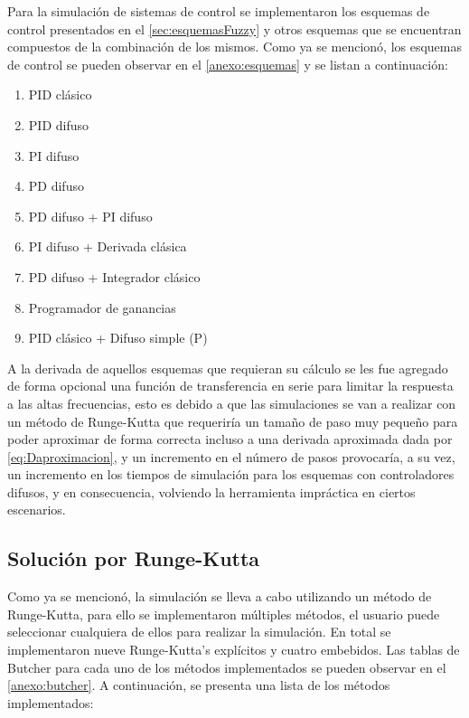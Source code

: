         Para la simulación de sistemas de control se implementaron los esquemas de control presentados en el \cref{sec:esquemasFuzzy} y otros esquemas que se encuentran compuestos de la combinación de los mismos. Como ya se mencionó, los esquemas de control se pueden observar en el \ref{anexo:esquemas} y se listan a continuación:

        \begin{enumerate}[leftmargin=\parindent]
            \item PID clásico
            \item PID difuso
            \item PI difuso
            \item PD difuso
            \item PD difuso + PI difuso
            \item PI difuso + Derivada clásica
            \item PD difuso + Integrador clásico
            \item Programador de ganancias
            \item PID clásico + Difuso simple (P)
        \end{enumerate}

        A la derivada de aquellos esquemas que requieran su cálculo se les fue agregado de forma opcional una función de transferencia en serie para limitar la respuesta a las altas frecuencias, esto es debido a que las simulaciones se van a realizar con un método de Runge-Kutta que requeriría un tamaño de paso muy pequeño para poder aproximar de forma correcta incluso a una derivada aproximada dada por \cref{eq:Daproximacion}, y un incremento en el número de pasos provocaría, a su vez, un incremento en los tiempos de simulación para los esquemas con controladores difusos, y en consecuencia, volviendo la herramienta impráctica en ciertos escenarios.

    \subsection{Solución por Runge-Kutta}

        Como ya se mencionó, la simulación se lleva a cabo utilizando un método de Runge-Kutta, para ello se implementaron múltiples métodos, el usuario puede seleccionar cualquiera de ellos para realizar la simulación. En total se implementaron nueve Runge-Kutta's explícitos y cuatro embebidos. Las tablas de Butcher para cada uno de los métodos implementados se pueden observar en el \ref{anexo:butcher}. A continuación, se presenta una lista de los métodos implementados:

